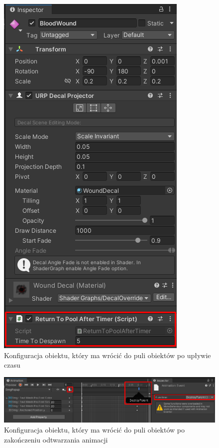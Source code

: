 \FloatBarrier
\begin{figure}[h]
    \centering
    \includegraphics[width=0.5\linewidth]{Images/timerObjPoolSetup.png}
    \caption{Konfiguracja obiektu, który ma wrócić do puli obiektów po upływie czasu}
\end{figure}
\FloatBarrier
\begin{figure}[h]
    \centering
    \includegraphics[width=1\linewidth]{Images/animObjPoolSetup.png}
    \caption{Konfiguracja obiektu, który ma wrócić do puli obiektów po zakończeniu odtwarzania animacji}
\end{figure}
\FloatBarrier
